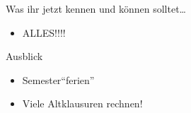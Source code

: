 	\begin{frame}{Was ihr jetzt kennen und können solltet\dots}
			\begin{itemize}
				\item ALLES!!!!
			\end{itemize}
	
	\end{frame}
	\begin{frame}{Ausblick}
		\begin{itemize}
			\item Semester``ferien''
			\item Viele Altklausuren rechnen!
		\end{itemize}
	\end{frame}
\section{}
\questionframe
{}
